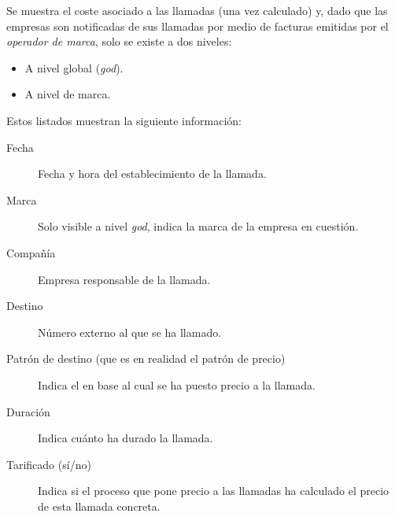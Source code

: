 \documentclass[letterpaper,10pt,spanish]{sphinxmanual}
\begin{document}
Se muestra el coste asociado a las llamadas (una vez calculado) y, dado que las empresas son notificadas de sus llamadas por medio de facturas emitidas por el \emph{operador de marca}, solo se existe a dos niveles:
\begin{itemize}
\item {} 
A nivel global (\emph{god}).

\item {} 
A nivel de marca.

\end{itemize}

Estos listados muestran la siguiente información:
\begin{description}
\item[{Fecha}] \leavevmode{}\label{billing_and_invoices/billable_calls:term-date}
Fecha y hora del establecimiento de la llamada.

\item[{Marca}] \leavevmode{}\label{billing_and_invoices/billable_calls:term-brand}
Solo visible a nivel \emph{god}, indica la marca de la empresa en cuestión.

\item[{Compañía}] \leavevmode{}\label{billing_and_invoices/billable_calls:term-company}
Empresa responsable de la llamada.

\item[{Destino}] \leavevmode{}\label{billing_and_invoices/billable_calls:term-destination}
Número externo al que se ha llamado.

\item[{Patrón de destino (que es en realidad el patrón de precio)}] \leavevmode{}\label{billing_and_invoices/billable_calls:term-pricing-pattern}
Indica el {\hyperref[external_outgoing_calls/noplan_nocall:price\string-pattern]{}} en base al cual se ha puesto precio a la llamada.

\item[{Duración}] \leavevmode{}\label{billing_and_invoices/billable_calls:term-duration}
Indica cuánto ha durado la llamada.

\item[{Tarificado (sí/no)}] \leavevmode{}\label{billing_and_invoices/billable_calls:term-metered-yes-no}
Indica si el proceso que pone precio a las llamadas ha calculado el precio de esta llamada concreta.


\end{description}
\end{document}
